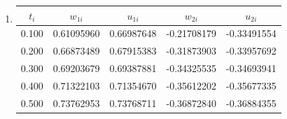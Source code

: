 \begin{posttest}
\begin{mysolution}
\begin{enumerate}[label=\arabic*.]
\begin{enumerate}[label=(\alph*).]
\item

\begin{center}
\begin{tabular}{ccccc}
\hline
$t_{i}$ & $w_{1 i}$ & $u_{1 i}$ & $w_{2 i}$ & $u_{2 i}$ \\
\hline
0.100 & 0.61095960 & 0.66987648 & -0.21708179 & -0.33491554 \\
0.200 & 0.66873489 & 0.67915383 & -0.31873903 & -0.33957692 \\
0.300 & 0.69203679 & 0.69387881 & -0.34325535 & -0.34693941 \\
0.400 & 0.71322103 & 0.71354670 & -0.35612202 & -0.35677335 \\
0.500 & 0.73762953 & 0.73768711 & -0.36872840 & -0.36884355 \\
\hline
\end{tabular}
\end{center}
\end{enumerate}
\end{enumerate}
\end{mysolution}
\end{posttest}




\takehome




